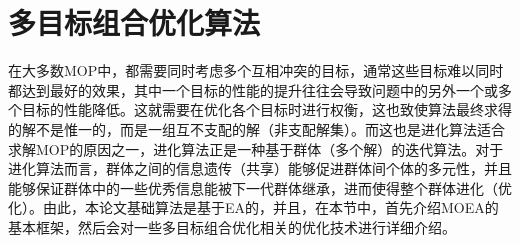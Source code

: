 \section{多目标组合优化算法}
\label{sec:背景介绍:多目标组合优化算法}
在大多数MOP中，都需要同时考虑多个互相冲突的目标，通常这些目标难以同时都达到最好的效果，其中一个目标的性能的提升往往会导致问题中的另外一个或多个目标的性能降低。这就需要在优化各个目标时进行权衡，这也致使算法最终求得的解不是惟一的，而是一组互不支配的解（非支配解集）。而这也是进化算法适合求解MOP的原因之一，进化算法正是一种基于群体（多个解）的迭代算法。对于进化算法而言，群体之间的信息遗传（共享）能够促进群体间个体的多元性，并且能够保证群体中的一些优秀信息能被下一代群体继承，进而使得整个群体进化（优化）。由此，本论文基础算法是基于EA的，并且，在本节中，首先介绍MOEA的基本框架，然后会对一些多目标组合优化相关的优化技术进行详细介绍。


